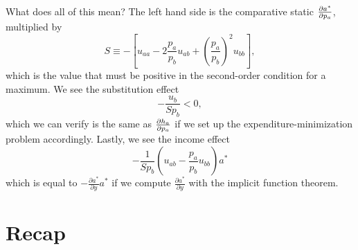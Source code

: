 What does all of this mean? The left hand side is the comparative static $\pdv{a^*}{p_a}$, multiplied by
$$
S \equiv -\left[u_{a a}-2 \frac{p_{a}}{p_{b}} u_{a b}+\left(\frac{p_{a}}{p_{b}}\right)^{2} u_{b b}\right],
$$
which is the value that must be positive in the second-order condition for a maximum. We see the substitution effect 
$$
-\frac{u_{b}}{S p_{b}}<0,
$$
which we can verify is the same as $\pdv{h_a}{p_a}$ if we set up the expenditure-minimization problem accordingly. Lastly, we see the income effect 
$$
-\frac{1}{S p_{b}}\left(u_{a b}-\frac{p_{a}}{p_{b}} u_{b b}\right) a^{*}
$$
which is equal to $-\frac{\partial a^{*}}{\partial y} a^{*}$ if we compute $\frac{\partial a^{*}}{\partial y}$ with the implicit function theorem.

\section*{Recap}
